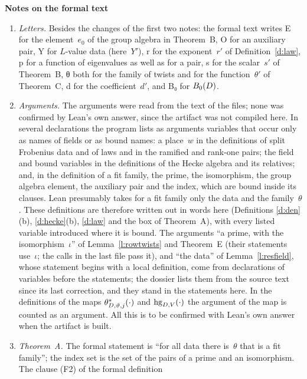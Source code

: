 \documentclass[11pt,a4paper]{article}
\newcommand{\leanfont}{\ttfamily\fontsize{8.6}{10.5}\selectfont\color{leancol}}
\newcommand{\m}[1]{\mbox{$#1$}}        %
\newcommand{\sect}[2]{\refstepcounter{section}\label{#2}\par\addvspace{19pt plus 4pt minus 2pt}\Needspace{7\baselineskip}%
  \noindent\llap{{\fontsize{13.2}{16}\selectfont\bfseries\color{inkfaint}\thesection}\hspace{9pt}}%
  {\fontsize{13.2}{16}\selectfont\bfseries\color{ink}#1}\par\nopagebreak\vspace{-1pt}}
\theoremstyle{plainx}
\theoremstyle{uprightx}
\begin{document}
\sect{Notes on the formal text}{s:notes}
\begin{enumerate}[label=\textup{\arabic*.},leftmargin=1.6em,itemsep=5pt]
\item \emph{Letters.} Besides the changes of the first two notes: the formal text writes {\leanfont E} for the
element~$e_0$ of the group algebra in Theorem~B, {\leanfont O} for an auxiliary pair, {\leanfont Y} for
$L$-value data (here~$Y'$), {\leanfont r} for the exponent~$r'$ of Definition~\ref{d:law}, {\leanfont p} for a
function of eigenvalues as well as for a pair, {\leanfont s} for the scalar~$s'$ of Theorem~B, {\leanfont θ}
both for the family of twists and for the function~$\theta'$ of Theorem~C, {\leanfont d} for the coefficient~$d'$,
and {\leanfont B₀} for \m{\Bzero{D}}.
\item \emph{Arguments.} The arguments were read from the text of the files; none was confirmed by Lean's own
answer, since the artifact was not compiled here. In several declarations the program lists as arguments
variables that occur only as names of fields or as bound names: a place~$w$ in the definitions of split
Frobenius data and of laws and in the ramified and rank-one pairs; the field and bound variables in the
definitions of the Hecke algebra and its relatives; and, in the definition of a fit family, the prime, the
isomorphism, the group algebra element, the auxiliary pair and the index, which are bound inside its clauses.
Lean presumably takes for a fit family only the data and the family~$\theta$. These definitions are therefore
written out in words here (Definitions \ref{d:den}(b), \ref{d:hecke}(b), \ref{d:law} and the box of Theorem~A), with
every listed variable introduced where it is bound. The arguments ``a prime, with
the isomorphism~$\iota$'' of Lemma~\ref{l:rowtwists} and Theorem~E (their statements use~$\iota$; the calls in the
last file pass it), and ``the data'' of Lemma~\ref{l:resfield}, whose statement begins with a local definition,
come from declarations of variables before the statements; the dossier lists them from the source text since
its last correction, and they stand in the statements here.
In the definitions of the maps \m{\auxLift{D}{\vartheta}{j}{\cdot}} and \m{\heckeOnGood{D}{V}{\cdot}} the argument of the
map is counted as an argument. All this is to be confirmed with Lean's own answer when the artifact is built.
\item \emph{Theorem~A.} The formal statement is ``for all data there is~$\theta$ that is a fit family''; the
index set is the set of the pairs of a prime and an isomorphism. The clause (F2) of the formal definition

\end{enumerate}
\end{document}
